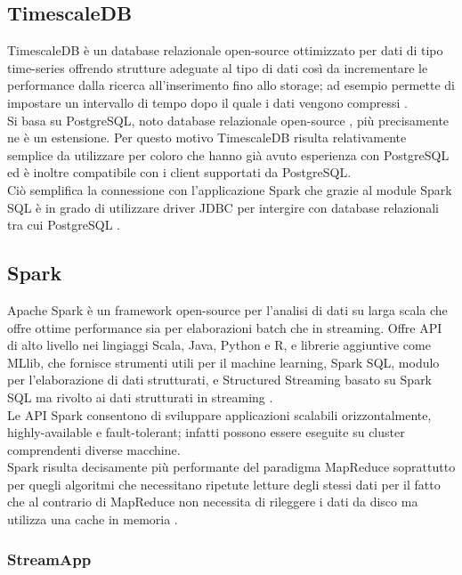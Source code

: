 \subsection{TimescaleDB}

TimescaleDB è un database relazionale open-source ottimizzato per dati di tipo time-series
offrendo strutture adeguate al tipo di dati così da incrementare le performance dalla ricerca
all'inserimento fino allo storage; ad esempio permette di impostare un intervallo di tempo
dopo il quale i dati vengono compressi \cite{timescale}.
\\
Si basa su PostgreSQL, noto database relazionale open-source \cite{postgresql}, più precisamente
ne è un estensione. Per questo motivo TimescaleDB risulta relativamente semplice da utilizzare
per coloro che hanno già avuto esperienza con PostgreSQL ed è inoltre compatibile con i client
supportati da PostgreSQL.
\\
Ciò semplifica la connessione con l'applicazione Spark che grazie al module Spark SQL è in grado
di utilizzare driver JDBC per intergire con database relazionali tra cui PostgreSQL
\cite{spark_sql}.

\subsection{Spark}

Apache Spark è un framework open-source per l'analisi di dati su larga scala che offre ottime
performance sia per elaborazioni batch che in streaming. Offre API di alto livello nei lingiaggi
Scala, Java, Python e R, e librerie aggiuntive come MLlib, che fornisce strumenti utili per il
machine learning, Spark SQL, modulo per l'elaborazione di dati strutturati,
e Structured Streaming basato su Spark SQL ma rivolto ai dati strutturati in streaming \cite{spark}.
\\
Le API Spark consentono di sviluppare applicazioni scalabili orizzontalmente, highly-available
e fault-tolerant; infatti possono
essere eseguite su cluster comprendenti diverse macchine.
\\
Spark risulta decisamente più performante del paradigma MapReduce soprattutto per quegli algoritmi
che necessitano ripetute letture degli stessi dati per il fatto che al contrario di MapReduce non
necessita di rileggere i dati da disco ma utilizza una cache in memoria \cite{spark_mapred}.

\subsubsection{StreamApp}

